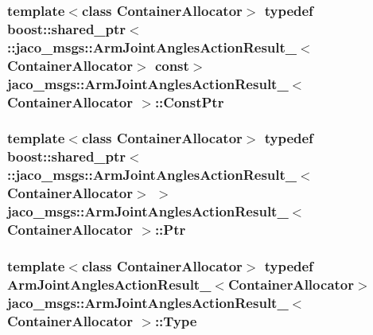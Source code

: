 \subsubsection[{\texorpdfstring{Const\+Ptr}{ConstPtr}}]{\setlength{\rightskip}{0pt plus 5cm}template$<$class Container\+Allocator$>$ typedef boost\+::shared\+\_\+ptr$<$ \+::{\bf jaco\+\_\+msgs\+::\+Arm\+Joint\+Angles\+Action\+Result\+\_\+}$<$Container\+Allocator$>$ const$>$ {\bf jaco\+\_\+msgs\+::\+Arm\+Joint\+Angles\+Action\+Result\+\_\+}$<$ Container\+Allocator $>$\+::{\bf Const\+Ptr}}\hypertarget{structjaco__msgs_1_1ArmJointAnglesActionResult___ab3afdaea077adcf14e033cacd0cfedf8}{}\label{structjaco__msgs_1_1ArmJointAnglesActionResult___ab3afdaea077adcf14e033cacd0cfedf8}
\subsubsection[{\texorpdfstring{Ptr}{Ptr}}]{\setlength{\rightskip}{0pt plus 5cm}template$<$class Container\+Allocator$>$ typedef boost\+::shared\+\_\+ptr$<$ \+::{\bf jaco\+\_\+msgs\+::\+Arm\+Joint\+Angles\+Action\+Result\+\_\+}$<$Container\+Allocator$>$ $>$ {\bf jaco\+\_\+msgs\+::\+Arm\+Joint\+Angles\+Action\+Result\+\_\+}$<$ Container\+Allocator $>$\+::{\bf Ptr}}\hypertarget{structjaco__msgs_1_1ArmJointAnglesActionResult___ad7fc9c910324c1e966afa2f7962d1d25}{}\label{structjaco__msgs_1_1ArmJointAnglesActionResult___ad7fc9c910324c1e966afa2f7962d1d25}
\subsubsection[{\texorpdfstring{Type}{Type}}]{\setlength{\rightskip}{0pt plus 5cm}template$<$class Container\+Allocator$>$ typedef {\bf Arm\+Joint\+Angles\+Action\+Result\+\_\+}$<$Container\+Allocator$>$ {\bf jaco\+\_\+msgs\+::\+Arm\+Joint\+Angles\+Action\+Result\+\_\+}$<$ Container\+Allocator $>$\+::{\bf Type}}\hypertarget{structjaco__msgs_1_1ArmJointAnglesActionResult___afe31dc82574f7e5e57a0de66b2f68750}{}\label{structjaco__msgs_1_1ArmJointAnglesActionResult___afe31dc82574f7e5e57a0de66b2f68750}


